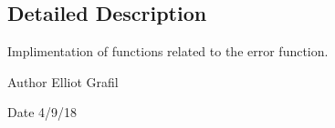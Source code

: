 \subsection{Detailed Description}
Implimentation of functions related to the error function. 

\begin{DoxyAuthor}{Author}
Elliot Grafil 
\end{DoxyAuthor}
\begin{DoxyDate}{Date}
4/9/18 
\end{DoxyDate}
